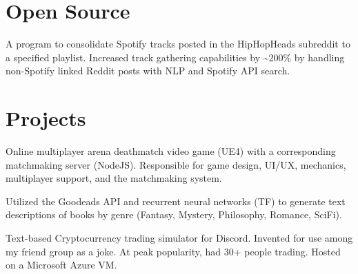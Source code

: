 \documentclass[]{deedy_resume}
\begin{document}
\begin{minipage}[t]{0.66\textwidth}

\section{Open Source}
A program to consolidate Spotify tracks posted in the HipHopHeads subreddit to a specified playlist. Increased track gathering capabilities by \~{}200\% by handling non-Spotify linked Reddit posts with NLP and Spotify API search.
\sectionsep



\section{Projects}
Online multiplayer arena deathmatch video game (UE4) with a corresponding matchmaking server (NodeJS). Responsible for game design, UI/UX, mechanics, multiplayer support, and the matchmaking system.
\sectionsep

Utilized the Goodeads API and recurrent neural networks (TF) to generate text descriptions of books by genre (Fantasy, Mystery, Philosophy, Romance, SciFi).
\sectionsep

Text-based Cryptocurrency trading simulator for Discord. Invented for use among my friend group as a joke. At peak popularity, had 30+ people trading. Hosted on a Microsoft Azure VM.
\sectionsep


\begin{comment}
\section{Publications} 
\renewcommand\refname{\vskip -1.5cm} %


\nocite{*}
\end{comment}

\end{minipage} 
\end{document}
